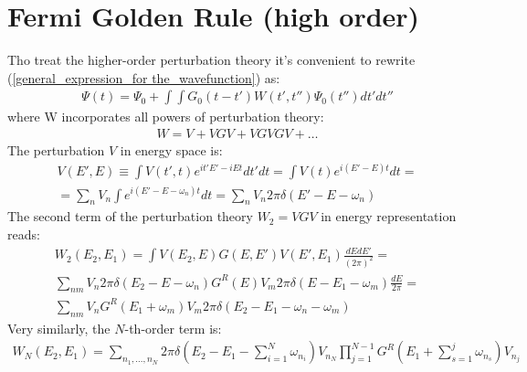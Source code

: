 \section{Fermi Golden Rule (high order)}
Tho treat the higher-order perturbation theory it's convenient to rewrite (\ref{general_expression_for the_wavefunction}) as:
\begin{gather}
	\Psi(t)=\Psi_{0}+\int\int G_{0}(t-t')W(t',t'')\Psi_{0}(t'')dt'dt''
\end{gather}
where W incorporates all powers of perturbation theory:
\begin{gather}
	W=V+VGV+VGVGV+\dots
\end{gather}
The perturbation $ V $ in energy space is:
\begin{multline}
	V(E',E)\equiv\int V(t',t)e^{it'E'-iEt}dt'dt=\int V(t)e^{i(E'-E)t}dt=\\=\sum_{n}V_{n}\int e^{i(E'-E-\omega_{n})t}dt=\sum_{n}V_{n}2\pi\delta(E'-E-\omega_{n})
\end{multline}
The second term of the perturbation theory $ W_{2}=VGV $ in energy representation reads:
\begin{multline}
	W_{2}(E_{2},E_{1})=\int V(E_{2},E)G(E,E')V(E',E_{1})\frac{dEdE'}{(2\pi)^{2}}=\\\sum_{nm}V_{n}2\pi\delta(E_{2}-E-\omega_{n})G^{R}(E)V_{m}2\pi\delta(E-E_{1}-\omega_{m})\frac{dE}{2\pi}=\\\sum_{nm}V_{n}G^{R}(E_{1}+\omega_{m})V_{m}2\pi\delta(E_{2}-E_{1}-\omega_{n}-\omega_{m})
\end{multline} 
Very similarly, the $ N $-th-order term is:
\begin{gather}
	W_{N}(E_{2},E_{1})=\sum_{n_{1},\dots,n_{N}}2\pi\delta\left(E_{2}-E_{1}-\sum_{i=1}^{N}\omega_{n_{i}}\right)V_{n_{N}}\prod_{j=1}^{N-1}G^{R}\left(E_{1}+\sum_{s=1}^{j}\omega_{n_{s}}\right)V_{n_{j}}
\end{gather}


